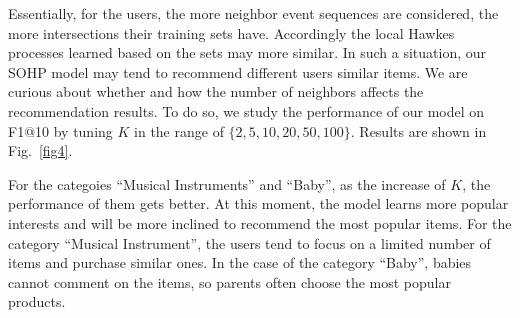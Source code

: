 \documentclass[runningheads]{llncs}
\begin{document}
Essentially, for the users, the more neighbor event sequences are considered, the more intersections their training sets have. 
Accordingly the local Hawkes processes learned based on the sets may more similar. 
In such a situation, our SOHP model may tend to recommend different users similar items.
We are curious about whether and how the number of neighbors affects the recommendation results.
To do so, we study the performance of our model on F1@10
by tuning $K$ in the range of $\{2,5,10,20,50,100\}$. 
Results are shown in Fig.~\ref{fig4}. 

For the categoies ``Musical Instruments'' and ``Baby'', as the increase of $K$, the performance of them gets better. 
At this moment, the model learns more popular interests and will be more inclined to recommend the most popular items. 
For the category ``Musical Instrument'', the users tend to focus on a limited number of items and purchase similar ones.
In the case of the category ``Baby'', babies cannot comment on the items, so parents often choose the most popular products.
\end{document}
